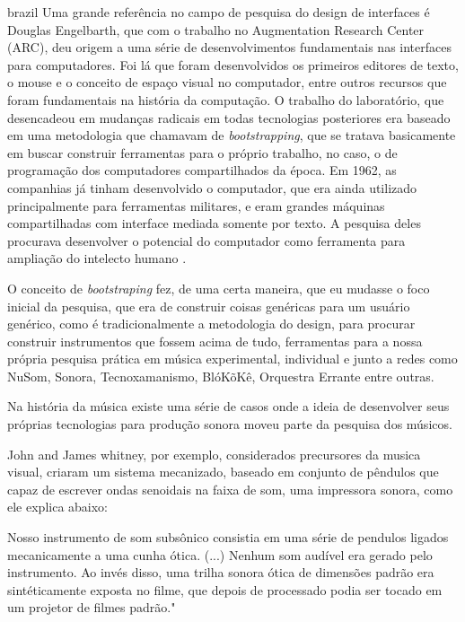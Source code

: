\begin{otherlanguage*}{brazil}
Uma grande referência no campo de pesquisa do design de interfaces é Douglas Engelbarth, que com o trabalho no Augmentation Research Center (ARC), deu origem a uma série de desenvolvimentos fundamentais nas interfaces para computadores. Foi lá que foram desenvolvidos os primeiros editores de texto, o mouse e o conceito de espaço visual no computador, entre outros recursos que foram fundamentais na história da computação. O trabalho do laboratório, que desencadeou em mudanças radicais em todas tecnologias posteriores era baseado em uma metodologia que chamavam de \emph{bootstrapping}, que se tratava basicamente em buscar construir ferramentas para o próprio trabalho, no caso, o de programação dos computadores compartilhados da época. Em 1962, as companhias já tinham desenvolvido o computador, que era ainda utilizado principalmente para ferramentas militares, e eram grandes máquinas compartilhadas com interface mediada somente por texto. A pesquisa deles procurava desenvolver o potencial do computador como ferramenta para ampliação do intelecto humano \cite{Engelbart1962}.

O conceito de \emph{bootstraping} fez, de uma certa maneira, que eu mudasse o foco inicial da pesquisa, que era de construir coisas genéricas para um usuário genérico, como é tradicionalmente a metodologia do design, para procurar construir instrumentos que fossem acima de tudo, ferramentas para a nossa própria pesquisa prática em música experimental, individual e junto a redes como NuSom, Sonora, Tecnoxamanismo, BlóKõKê, Orquestra Errante entre outras.

Na história da música existe uma série de casos onde a ideia de desenvolver seus próprias tecnologias para produção sonora moveu parte da pesquisa dos músicos.

John and James whitney, por exemplo, considerados precursores da musica visual, criaram um sistema mecanizado, baseado em conjunto de pêndulos que capaz de escrever ondas senoidais na faixa de som, uma impressora sonora, como ele explica abaixo:

\begin{citacao}
Nosso instrumento de som subsônico consistia em uma série de pendulos ligados mecanicamente a uma cunha ótica. (...) Nenhum som audível era gerado pelo instrumento. Ao invés disso, uma trilha sonora ótica de dimensões padrão era sintéticamente exposta no filme, que depois de processado podia ser tocado em um projetor de filmes padrão."\cite[152]{Whitney1980} 
\end{citacao}


\end{otherlanguage*}
